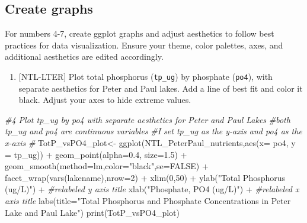 \documentclass[
]{article}
\newenvironment{Shaded}{\begin{snugshade}}{\end{snugshade}}
\newcommand{\AttributeTok}[1]{\textcolor[rgb]{0.77,0.63,0.00}{#1}}
\newcommand{\CommentTok}[1]{\textcolor[rgb]{0.56,0.35,0.01}{\textit{#1}}}
\newcommand{\ConstantTok}[1]{\textcolor[rgb]{0.00,0.00,0.00}{#1}}
\newcommand{\DecValTok}[1]{\textcolor[rgb]{0.00,0.00,0.81}{#1}}
\newcommand{\FloatTok}[1]{\textcolor[rgb]{0.00,0.00,0.81}{#1}}
\newcommand{\FunctionTok}[1]{\textcolor[rgb]{0.00,0.00,0.00}{#1}}
\newcommand{\NormalTok}[1]{#1}
\newcommand{\OtherTok}[1]{\textcolor[rgb]{0.56,0.35,0.01}{#1}}
\newcommand{\SpecialCharTok}[1]{\textcolor[rgb]{0.00,0.00,0.00}{#1}}
\newcommand{\StringTok}[1]{\textcolor[rgb]{0.31,0.60,0.02}{#1}}
\providecommand{\tightlist}{%
  \setlength{\itemsep}{0pt}\setlength{\parskip}{0pt}}
\begin{document}
\hypertarget{create-graphs}{%
\subsection{Create graphs}\label{create-graphs}}

For numbers 4-7, create ggplot graphs and adjust aesthetics to follow
best practices for data visualization. Ensure your theme, color
palettes, axes, and additional aesthetics are edited accordingly.

\begin{enumerate}
\def\labelenumi{\arabic{enumi}.}
\setcounter{enumi}{3}
\tightlist
\item
  {[}NTL-LTER{]} Plot total phosphorus (\texttt{tp\_ug}) by phosphate
  (\texttt{po4}), with separate aesthetics for Peter and Paul lakes. Add
  a line of best fit and color it black. Adjust your axes to hide
  extreme values.
\end{enumerate}

\begin{Shaded}
\begin{Highlighting}[]
\CommentTok{\#4 Plot tp\_ug by po4 with separate aesthetics for Peter and Paul Lakes}
\CommentTok{\#both tp\_ug and po4 are continuous variables }
\CommentTok{\#I set tp\_ug as the y{-}axis and po4 as the x{-}axis}
\CommentTok{\#}
\NormalTok{TotP\_vsPO4\_plot}\OtherTok{\textless{}{-}} 
  \FunctionTok{ggplot}\NormalTok{(NTL\_PeterPaul\_nutrients,}\FunctionTok{aes}\NormalTok{(}\AttributeTok{x=}\NormalTok{ po4, }\AttributeTok{y =}\NormalTok{ tp\_ug)) }\SpecialCharTok{+}
         \FunctionTok{geom\_point}\NormalTok{(}\AttributeTok{alpha=}\FloatTok{0.4}\NormalTok{, }\AttributeTok{size=}\FloatTok{1.5}\NormalTok{) }\SpecialCharTok{+}
         \FunctionTok{geom\_smooth}\NormalTok{(}\AttributeTok{method=}\NormalTok{lm,}\AttributeTok{color=}\StringTok{"black"}\NormalTok{,}\AttributeTok{se=}\ConstantTok{FALSE}\NormalTok{) }\SpecialCharTok{+}
         \FunctionTok{facet\_wrap}\NormalTok{(}\FunctionTok{vars}\NormalTok{(lakename),}\AttributeTok{nrow=}\DecValTok{2}\NormalTok{) }\SpecialCharTok{+}
         \FunctionTok{xlim}\NormalTok{(}\DecValTok{0}\NormalTok{,}\DecValTok{50}\NormalTok{) }\SpecialCharTok{+}
         \FunctionTok{ylab}\NormalTok{(}\StringTok{"Total Phosphorus (ug/L)"}\NormalTok{) }\SpecialCharTok{+} \CommentTok{\#relabeled y axis title}
         \FunctionTok{xlab}\NormalTok{(}\StringTok{"Phosphate, PO4 (ug/L)"}\NormalTok{) }\SpecialCharTok{+} \CommentTok{\#relabeled x axis title}
         \FunctionTok{labs}\NormalTok{(}\AttributeTok{title=}\StringTok{"Total Phosphorus and Phosphate Concentrations in Peter Lake and Paul Lake"}\NormalTok{)}
\FunctionTok{print}\NormalTok{(TotP\_vsPO4\_plot)             }
\end{Highlighting}
\end{Shaded}
\end{document}

